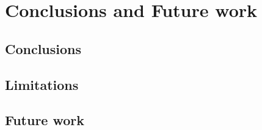 ﻿\chapter{Conclusions and Future work}
\label{ch:conclusionsAndFutureWork}




\section{Conclusions}
\label{sec:conclusions}










\section{Limitations}
\label{sec:limitations}




\section{Future work}
\label{sec:futureWork}






